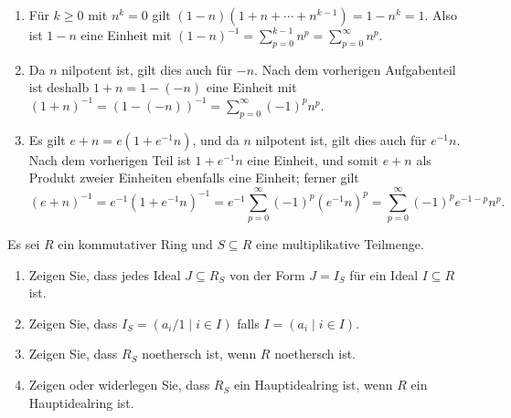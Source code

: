 \begin{solution}
  \begin{enumerate}
    \item
      Für $k \geq 0$ mit $n^k = 0$ gilt $(1 - n)(1 + n + \dotsb + n^{k-1}) = 1 - n^k = 1$.
      Also ist $1 - n$ eine Einheit mit $(1-n)^{-1} = \sum_{p=0}^{k-1} n^p = \sum_{p=0}^\infty n^p$.
    \item
      Da $n$ nilpotent ist, gilt dies auch für $-n$.
      Nach dem vorherigen Aufgabenteil ist deshalb $1 + n = 1 - (-n)$ eine Einheit mit $(1 + n)^{-1} = (1 - (-n))^{-1} = \sum_{p=0}^\infty (-1)^p n^p$.
    \item
      Es gilt $e + n = e(1 + e^{-1} n)$, und da $n$ nilpotent ist, gilt dies auch für $e^{-1} n$.
      Nach dem vorherigen Teil ist $1 + e^{-1} n$ eine Einheit, und somit $e + n$ als Produkt zweier Einheiten ebenfalls eine Einheit; ferner gilt
      \[
          (e + n)^{-1}
        = e^{-1} (1 + e^{-1} n)^{-1}
        = e^{-1} \sum_{p=0}^\infty (-1)^p (e^{-1} n)^p
        = \sum_{p=0}^\infty (-1)^p e^{-1-p} n^p.
      \]
  \end{enumerate}
\end{solution}


\begin{question}[subtitle = Ideale in der Lokalisierung]
  Es sei $R$ ein kommutativer Ring und $S \subseteq R$ eine multiplikative Teilmenge.
  \begin{enumerate}
    \item
      Zeigen Sie, dass jedes Ideal $J \subseteq R_S$ von der Form $J = I_S$ für ein Ideal $I \subseteq R$ ist.
    \item
      Zeigen Sie, dass $I_S = (a_i/1 \mid i \in I)$ falls $I = (a_i \mid i \in I)$.
    \item
      Zeigen Sie, dass $R_S$ noethersch ist, wenn $R$ noethersch ist.
    \item
      Zeigen oder widerlegen Sie, dass $R_S$ ein Hauptidealring ist, wenn $R$ ein Hauptidealring ist.
  \end{enumerate}
\end{question}


